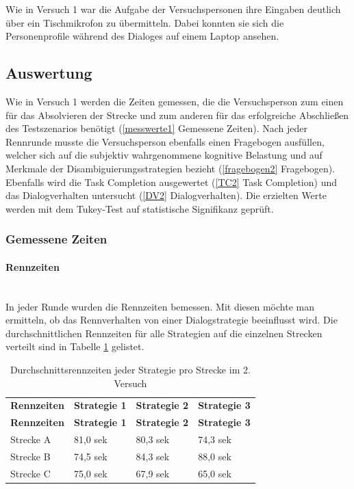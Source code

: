 \documentclass[12pt,a4paper]{scrartcl}
\begin{document}
Wie in Versuch 1 war die Aufgabe der Versuchspersonen ihre Eingaben deutlich über ein Tischmikrofon zu übermitteln. Dabei konnten sie sich die Personenprofile während des Dialoges auf einem Laptop ansehen.



\subsection{Auswertung}
\label{auswertung2}
Wie in Versuch 1 werden die Zeiten gemessen, die die Versuchsperson zum einen für das Absolvieren der Strecke und zum anderen für das erfolgreiche Abschließen des Testszenarios benötigt (\ref{messwerte1} Gemessene Zeiten).
Nach jeder Rennrunde musste die Versuchsperson ebenfalls einen Fragebogen ausfüllen, welcher sich auf die subjektiv wahrgenommene kognitive Belastung und auf Merkmale der Disambiguierungsstrategien bezieht (\ref{fragebogen2} Fragebogen). Ebenfalls wird die Task Completion ausgewertet (\ref{TC2} Task Completion) und das Dialogverhalten untersucht (\ref{DV2} Dialogverhalten). Die erzielten Werte werden mit dem Tukey-Test
auf statistische Signifikanz geprüft. 
\subsubsection{Gemessene Zeiten}
\label{messwerte}
\paragraph{Rennzeiten} 
~\\
In jeder Runde wurden die Rennzeiten bemessen. Mit diesen möchte man ermitteln, ob das Rennverhalten von einer Dialogstrategie beeinflusst wird. 
Die durchschnittlichen Rennzeiten für alle Strategien auf die einzelnen Strecken verteilt sind in Tabelle \ref{RZ3SV2} gelistet. 
\begin{longtable}{p{3cm}p{3cm}p{3cm}p{3cm} }
	\label{RZ3SV2}\\
	\caption[Durchschnittsrennzeiten jeder Strategie pro Strecke im 2. Versuch]{Durchschnittsrennzeiten jeder Strategie pro Strecke im 2. Versuch}\\
	\hline
	\textbf{Rennzeiten}&\textbf{Strategie 1}&\textbf{Strategie 2} &\textbf{Strategie 3}\\
	\hline
	\endfirsthead
	\hline
	\textbf{Rennzeiten}&\textbf{Strategie 1}&\textbf{Strategie 2} &\textbf{Strategie 3}\\
	\hline
	\endhead
Strecke A & 81,0 sek & 80,3 sek & 74,3 sek \\
Strecke B & 74,5 sek & 84,3 sek & 88,0 sek \\
Strecke C & 75,0 sek & 67,9 sek & 65,0 sek \\
\hline
\end{longtable}
\end{document}
